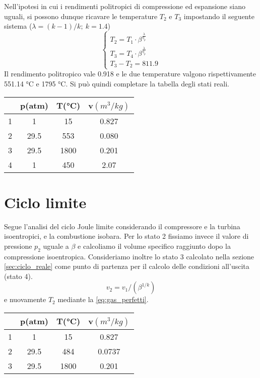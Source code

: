 \documentclass[a4paper,12pt]{article}
\begin{document}
Nell'ipotesi in cui i rendimenti politropici di compressione ed espansione siano uguali, si possono dunque ricavare le temperature $T_2$ e $T_3$ impostando il seguente sistema
($\lambda = (k-1)/k;\ k=1.4$)
$$
\begin{cases}
    T_2 = T_1\cdot\beta^{\frac{\lambda}{\eta_p}} \\
    T_3 = T_4\cdot\beta^{\frac{\lambda}{\eta_p}}\\
    T_3-T_2 = 811.9
\end{cases}
$$
Il rendimento politropico vale 0.918 e le due temperature valgono rispettivamente 551.14 °C e 1795 °C.
Si può quindi completare la tabella degli stati reali.
\begin{center}
    \begin{tabular}{c|c|c|c}
            &p(atm) &T(°C)  &v$(m^3/kg)$     \\ \hline
        1   &    1  & 15    & 0.827   \\
        2   &   29.5&553    & 0.080   \\
        3   &   29.5&1800   & 0.201   \\
        4   &   1   & 450   & 2.07
    \end{tabular}
\end{center}

\section{Ciclo limite}
\label{sec:ciclo_limite}
Segue l'analisi del ciclo Joule limite considerando il compressore e la turbina isoentropici, e la combustione isobara.
Per lo stato 2 fissiamo invece il valore di pressione $p_2$ uguale a $\beta$ e calcoliamo il volume specifico raggiunto dopo la compressione isoentropica.
Consideriamo inoltre lo stato 3 calcolato nella sezione \ref{sec:ciclo_reale} come punto di partenza per il calcolo delle condizioni all'uscita (stato 4).
\begin{equation*}
    v_2 = v_1/(\beta^{1/k})
\end{equation*}
e nuovamente $T_2$ mediante la \eqref{eq:gas_perfetti}.
\begin{center}
    \begin{tabular}{c|c|c|c}
            &p(atm) &T(°C)  &v$(m^3/kg)$     \\ \hline
        1   &    1  & 15    & 0.827   \\
        2   &   29.5& 484   & 0.0737  \\
        3   &   29.5&1800   & 0.201   \\
    \end{tabular}
\end{center}
\end{document}
